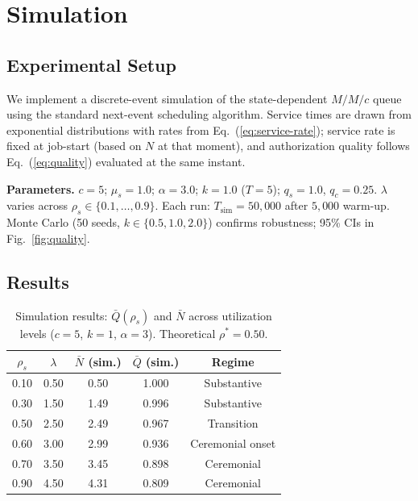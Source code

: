 \documentclass[runningheads]{llncs}
\begin{document}
\section{Simulation}
\label{sec:simulation}

\subsection{Experimental Setup}

We implement a discrete-event simulation of the state-dependent $M/M/c$ queue
using the standard next-event scheduling algorithm. Service times are drawn
from exponential distributions with rates from Eq.~(\ref{eq:service-rate});
service rate is fixed at job-start (based on $N$ at that moment), and authorization
quality follows Eq.~(\ref{eq:quality}) evaluated at the same instant.

\smallskip\noindent\textbf{Parameters.}
$c = 5$; $\mu_s = 1.0$; $\alpha = 3.0$; $k = 1.0$ ($T = 5$); $q_s = 1.0$, $q_c = 0.25$.
$\lambda$ varies across $\rho_s \in \{0.1, \ldots, 0.9\}$. Each run: $T_{\mathrm{sim}} = 50{,}000$
after $5{,}000$ warm-up. Monte Carlo (50 seeds, $k\in\{0.5,1.0,2.0\}$) confirms
robustness; 95\% CIs in Fig.~\ref{fig:quality}.

\subsection{Results}

\begin{table}[t]
\centering
\caption{Simulation results: $\bar{Q}(\rho_s)$ and $\bar{N}$ across utilization levels
($c=5$, $k=1$, $\alpha=3$). Theoretical $\rho^* = 0.50$.}
\label{tab:simulation}
\begin{tabular}{@{}ccccc@{}}
\toprule
$\rho_s$ & $\lambda$ & $\bar{N}$ (sim.) & $\bar{Q}$ (sim.) & Regime \\
\midrule
0.10 & 0.50 & 0.50  & 1.000 & Substantive \\
0.30 & 1.50 & 1.49  & 0.996 & Substantive \\
0.50 & 2.50 & 2.49  & 0.967 & Transition \\
0.60 & 3.00 & 2.99  & 0.936 & Ceremonial onset \\
0.70 & 3.50 & 3.45  & 0.898 & Ceremonial \\
0.90 & 4.50 & 4.31  & 0.809 & Ceremonial \\
\bottomrule
\end{tabular}
\end{table}
\end{document}
